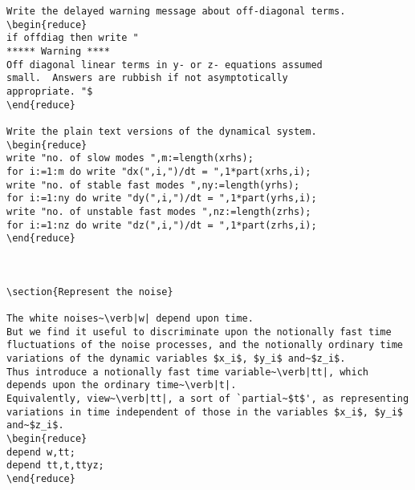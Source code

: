 \documentclass[11pt,a5paper]{article}
\begin{document}
\begin{reduce}
\begin{verbatim}
Write the delayed warning message about off-diagonal terms.
\begin{reduce}
if offdiag then write "
***** Warning ****
Off diagonal linear terms in y- or z- equations assumed
small.  Answers are rubbish if not asymptotically
appropriate. "$
\end{reduce}

Write the plain text versions of the dynamical system.
\begin{reduce}
write "no. of slow modes ",m:=length(xrhs);
for i:=1:m do write "dx(",i,")/dt = ",1*part(xrhs,i);
write "no. of stable fast modes ",ny:=length(yrhs);
for i:=1:ny do write "dy(",i,")/dt = ",1*part(yrhs,i);
write "no. of unstable fast modes ",nz:=length(zrhs);
for i:=1:nz do write "dz(",i,")/dt = ",1*part(zrhs,i);
\end{reduce}



\section{Represent the noise}

The white noises~\verb|w| depend upon time.
But we find it useful to discriminate upon the notionally fast time fluctuations of the noise processes, and the notionally ordinary time variations of the dynamic variables $x_i$, $y_i$ and~$z_i$.
Thus introduce a notionally fast time variable~\verb|tt|, which depends upon the ordinary time~\verb|t|.
Equivalently, view~\verb|tt|, a sort of `partial~$t$', as representing variations in time independent of those in the variables $x_i$, $y_i$ and~$z_i$.
\begin{reduce}
depend w,tt;
depend tt,t,ttyz;
\end{reduce}


\end{verbatim}
\end{reduce}
\end{document}
